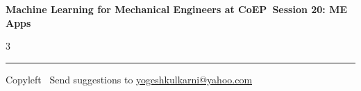 \documentclass[8pt,landscape]{article}
\begin{document}
\footnotesize

\begin{center}
\Large{\textbf{Machine Learning for Mechanical Engineers at CoEP\ Session 20: ME Apps}}
\end{center}

\begin{multicols}{3}

\end{multicols}

\rule{\linewidth}{0.25pt}
\scriptsize
Copyleft \textcopyleft\  Send suggestions to
\href{http://www.yogeshkulkarni.com}{yogeshkulkarni@yahoo.com}
\end{document}
